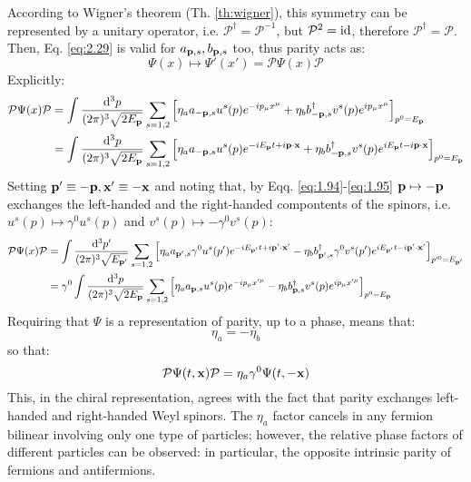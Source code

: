 According to Wigner's theorem (Th. \ref{th:wigner}), this symmetry can be represented by a unitary operator, i.e. $ \mathcal{P}^\dagger = \mathcal{P}^{-1} $, but $ \mathcal{P}^2 = \operatorname{id} $, therefore $ \mathcal{P}^\dagger = \mathcal{P} $. Then, Eq. \ref{eq:2.29} is valid for $ a_{\mathbf{p},s} , b_{\mathbf{p},s} $ too, thus parity acts as:
\begin{equation}
  \Psi(x) \mapsto \Psi'(x') = \mathcal{P} \Psi(x) \mathcal{P}
  \label{eq:2.30}
\end{equation}
Explicitly:
\begin{equation*}
  \begin{split}
    \mathcal{P} \Psi(x) \mathcal{P}
    &= \int \frac{\mathrm{d}^3p}{(2\pi)^3 \sqrt{2E_{\mathbf{p}}}} \sum_{s = 1,2} \left[ \eta_a a_{-\mathbf{p},s} u^s(p) e^{-i p_\mu x^\mu} + \eta_b b_{-\mathbf{p},s}^\dagger v^s(p) e^{i p_\mu x^\mu} \right]_{p^0 = E_{\mathbf{p}}} \\
    &= \int \frac{\mathrm{d}^3p}{(2\pi)^3 \sqrt{2E_{\mathbf{p}}}} \sum_{s = 1,2} \left[ \eta_a a_{-\mathbf{p},s} u^s(p) e^{-i E_{\mathbf{p}} t + i \mathbf{p} \cdot \mathbf{x}} + \eta_b b_{-\mathbf{p},s}^\dagger v^s(p) e^{i E_{\mathbf{p}} t - i \mathbf{p} \cdot \mathbf{x}} \right]_{p^0 = E_{\mathbf{p}}} \\
  \end{split}
\end{equation*}
Setting $ \mathbf{p}' \equiv - \mathbf{p} , \mathbf{x}' \equiv -\mathbf{x} $ and noting that, by Eqq. \ref{eq:1.94}-\ref{eq:1.95} $ \mathbf{p} \mapsto -\mathbf{p} $ exchanges the left-handed and the right-handed compontents of the spinors, i.e. $ u^s(p) \mapsto \gamma^0 u^s(p) $ and $ v^s(p) \mapsto - \gamma^0 v^s(p) $:
\begin{equation*}
  \begin{split}
    \mathcal{P} \Psi(x) \mathcal{P}
    &= \int \frac{\mathrm{d}^3p'}{(2\pi)^3 \sqrt{E_{\mathbf{p}'}}} \sum_{s = 1,2} \left[ \eta_a a_{\mathbf{p}',s} \gamma^0 u^s(p') e^{-i E_{\mathbf{p}'} t + i \mathbf{p}' \cdot \mathbf{x}'} - \eta_b b_{\mathbf{p}',s}^\dagger \gamma^0 v^s(p') e^{i E_{\mathbf{p}'} t - i \mathbf{p}' \cdot \mathbf{x}'} \right]_{p'^0 = E_{\mathbf{p}'}} \\
    &= \gamma^0 \int \frac{\mathrm{d}^3p}{(2\pi)^3 \sqrt{2E_{\mathbf{p}}}} \sum_{s = 1,2} \left[ \eta_a a_{\mathbf{p},s} u^s(p) e^{-i p_\mu x'^\mu} - \eta_b b_{\mathbf{p},s}^\dagger v^s(p) e^{i p_\mu x'^\mu} \right]_{p^0 = E_{\mathbf{p}}}
  \end{split}
\end{equation*}
Requiring that $ \Psi $ is a representation of parity, up to a phase, means that:
\begin{equation}
  \eta_a = - \eta_b
  \label{eq:2.31}
\end{equation}
so that:
\begin{equation}
  \mathcal{P} \Psi(t,\mathbf{x}) \mathcal{P} = \eta_a \gamma^0 \Psi(t,-\mathbf{x})
  \label{eq:2.32}
\end{equation}
This, in the chiral representation, agrees with the fact that parity exchanges left-handed and right-handed Weyl spinors. The $ \eta_a $ factor cancels in any fermion bilinear involving only one type of particles; however, the relative phase factors of different particles can be observed: in particular, the opposite intrinsic parity of fermions and antifermions.

